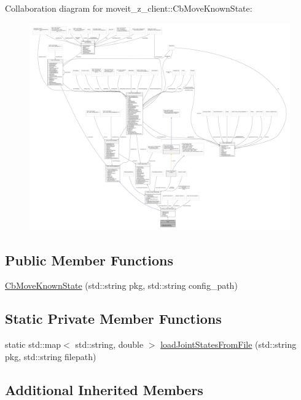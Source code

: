 Collaboration diagram for moveit\+\_\+z\+\_\+client\+:\+:Cb\+Move\+Known\+State\+:
\nopagebreak
\begin{figure}[H]
\begin{center}
\leavevmode
\includegraphics[width=350pt]{classmoveit__z__client_1_1CbMoveKnownState__coll__graph}
\end{center}
\end{figure}
\subsection*{Public Member Functions}
\begin{DoxyCompactItemize}
\item 
\hyperlink{classmoveit__z__client_1_1CbMoveKnownState_a8840d740bac0275a2ead514bf72f31b2}{Cb\+Move\+Known\+State} (std\+::string pkg, std\+::string config\+\_\+path)
\end{DoxyCompactItemize}
\subsection*{Static Private Member Functions}
\begin{DoxyCompactItemize}
\item 
static std\+::map$<$ std\+::string, double $>$ \hyperlink{classmoveit__z__client_1_1CbMoveKnownState_ac5b7069781a33407d56cb19c2811a098}{load\+Joint\+States\+From\+File} (std\+::string pkg, std\+::string filepath)
\end{DoxyCompactItemize}
\subsection*{Additional Inherited Members}


